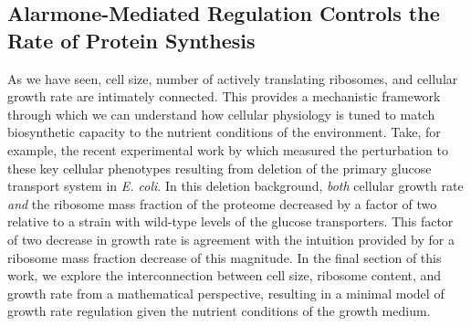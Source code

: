 



\subsection{Alarmone-Mediated Regulation Controls the Rate of Protein Synthesis}

As we have seen, cell size, number of actively translating ribosomes, and
cellular growth rate are intimately connected. This provides a mechanistic
framework through which we can understand how cellular physiology is tuned to
match biosynthetic capacity to the nutrient conditions of the environment. Take,
for example, the recent experimental work by \cite{dai2016} which measured the
perturbation to these key cellular phenotypes resulting from deletion of the
primary glucose transport system in \textit{E. coli}. In this deletion
background, \textit{both} cellular growth rate \textit{and} the ribosome mass fraction of the
proteome decreased by a factor of two relative to a strain with wild-type levels
of the glucose transporters. This factor of two decrease in growth rate
is agreement with the intuition provided by 
for a ribosome mass fraction decrease of this magnitude. In the final section of
this work, we explore the interconnection between cell size, ribosome content,
and growth rate from a mathematical perspective, resulting in a minimal model
of growth rate regulation given the nutrient conditions of the growth medium.

